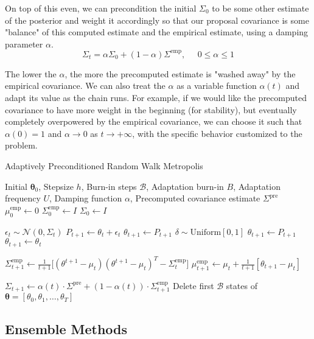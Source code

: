     On top of this even, we can precondition the initial $\Sigma_0$ to be some other estimate of the posterior and weight it accordingly so that our proposal covariance is some "balance" of this computed estimate and the empirical estimate, using a damping parameter $\alpha$. 
    \begin{equation}
      \Sigma_t = \alpha \Sigma_0 + (1 - \alpha) \Sigma^{\mathrm{emp}}, \;\;\;\;\; 0 \leq \alpha \leq 1
    \end{equation}

    The lower the $\alpha$, the more the precomputed estimate is "washed away" by the empirical covariance. We can also treat the $\alpha$ as a variable function $\alpha(t)$ and adapt its value as the chain runs. For example, if we would like the precomputed covariance to have more weight in the beginning (for stability), but eventually completely overpowered by the empirical covariance, we can choose it such that $\alpha(0) = 1$ and $\alpha \rightarrow 0$ as $t \rightarrow +\infty$, with the specific behavior customized to the problem. 

    \begin{algorithm}
      \caption{Adaptively Preconditioned Random Walk Metropolis}\label{alg:adaptive_precon_metro}
      \begin{algorithmic}

      \Require Initial $\boldsymbol{\theta}_0$, Stepsize $h$, Burn-in steps $\mathcal{B}$, Adaptation burn-in $B$, Adaptation frequency $U$, Damping function $\alpha$, Precomputed covariance estimate $\Sigma^{\mathrm{pre}}$
      \State $\mu_0^\mathrm{emp} \gets 0$ 
      \State $\Sigma^\mathrm{emp}_0 \gets I$
      \State $\Sigma_0 \gets I$

          \State $\epsilon_t \sim \mathcal{N}(0, \Sigma_t)$ 
          \State $P_{t+1} \gets \theta_t + \epsilon_t$
              \State $\theta_{t+1} \gets P_{t+1}$ 
          \Else
              \State $\delta \sim \mathrm{Uniform}[0, 1]$
                  \State $\theta_{t+1} \gets P_{t+1}$ 
              \Else 
                  \State $\theta_{t+1} \gets \theta_t$
              \EndIf
          \EndIf
          
          \State $\Sigma^\mathrm{emp}_{t+1} \gets \frac{1}{t+1} \big[(\theta^{t+1} - \mu_t) (\theta^{t+1} - \mu_t)^T - \Sigma^\mathrm{emp}_t \big]$
          \State $\mu_{t+1}^\mathrm{emp} \gets \mu_t + \frac{1}{t+1} [ \theta_{t+1} - \mu_t ]$
          
              \State $\Sigma_{t+1} \gets \alpha(t) \cdot \Sigma^\mathrm{pre} + (1 - \alpha(t)) \cdot \Sigma^\mathrm{emp}_{t+1}$
          \EndIf
      \EndFor
      \State Delete first $\mathcal{B}$ states of $\boldsymbol{\theta} = [\theta_0, \theta_1, \ldots, \theta_T]$

      \end{algorithmic}
    \end{algorithm}

  \subsection{Ensemble Methods}

